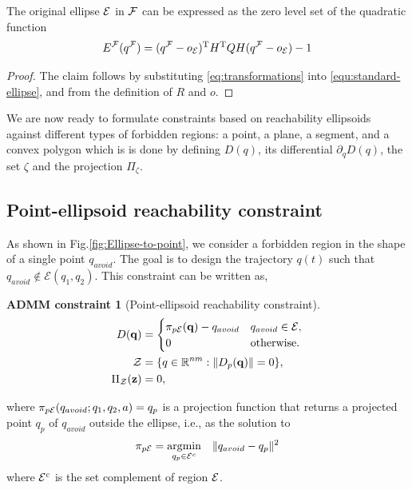 \documentclass[10pt,twocolumn,twoside]{IEEEtran}
\newtheorem{constraint}{ADMM constraint}
\def\sZ{\mathcal{Z}}
\begin{document}
\begin{lemma}
The original ellipse $\mathcal{E}$ in $\mathcal{F}$ can be expressed as the zero level set of the quadratic function
   \begin{equation}\label{eq:ellpsoid from canonical}
     {E^{\mathcal{F}}}({q^{\mathcal{F}}}) = ({q^{\mathcal{F}}}-o_{\mathcal{E}})^\mathrm{T} H^\mathrm{T} Q H ({q^{\mathcal{F}}}-o_{\mathcal{E}}) - 1
     \end{equation}
\end{lemma}
\begin{proof}
    The claim follows by substituting  \eqref{eq:transformations} into \eqref{equ:standard-ellipse}, and from the definition of $R$ and $o$.
\end{proof}

We are now ready to formulate constraints based on reachability ellipsoids against different types of forbidden regions: a point, a plane, a segment, and a convex polygon which is is done by defining $D(q)$, its differential $\partial_qD(q)$, the set $\zeta$ and the projection $\Pi_\zeta$.

\subsection{Point-ellipsoid reachability constraint}\label{sec:ellipsoid-point}
As shown in Fig.\ref{fig:Ellipse-to-point}, we consider a forbidden region in the shape of a single point $q_{avoid}$. The goal is to design the trajectory $q(t)$ such that $q_{avoid}\notin\mathcal{E}(q_1,q_2)$. This constraint can be written as, 

\begin{constraint}[Point-ellipsoid reachability constraint]
\begin{align}
D(\vq) &=  \begin{cases}
      \pi_{p\cE}(\vq) - q_{avoid} & q_{avoid} \in \cE, \\
      {0} & \textrm{otherwise}.
    \end{cases} \label{eq:point_ellipsoid_constraint}\\
  \sZ &= \{q\in\mathbb{R}^{nm}:\norm{D_p(\vq)} = 0 \},\\
   \Pi_\sZ(\vz) & = 0, 
\end{align}
\end{constraint}

where $\pi_{p\mathcal{E}}(q_{avoid};q_1,q_2,a) = q_p$ is a projection function that returns a projected point $q_p$ of $q_{avoid}$ outside the ellipse, i.e., as the solution to
\begin{equation}\label{eq:ellipse-point-projection}
\pi_{p\mathcal{E}}=\operatorname*{\arg\!\min}_{q_p\in\mathcal{E}^c} \quad \lVert q_{avoid}-q_p\rVert^2 
\end{equation}
where $\mathcal{E}^{c}$ is the set complement of region $\mathcal{E}$.
\end{document}
